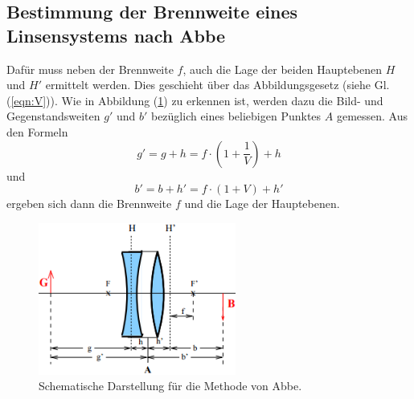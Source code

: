 \subsection{Bestimmung der Brennweite eines Linsensystems nach Abbe}
Dafür muss neben der Brennweite $f$, auch die Lage der beiden Hauptebenen $H$ und $H'$ ermittelt werden. Dies geschieht über das Abbildungsgesetz (siehe Gl. (\ref{eqn:V})). Wie in Abbildung (\ref{fig:Abbe}) zu erkennen ist, werden dazu die Bild- und Gegenstandsweiten $g'$ und $b'$ bezüglich eines beliebigen Punktes $A$ gemessen. Aus den Formeln
\begin{equation}
	g' = g + h = f \cdot \left( 1 + \frac{1}{V} \right) + h
\end{equation}
und
\begin{equation}
	b' = b + h' = f \cdot (1 + V) + h'
\end{equation}
ergeben sich dann die Brennweite $f$ und die Lage der Hauptebenen.

\begin{figure}[H]
	\centering
	\includegraphics[height=5cm]{picture/Abbe}
	\caption{Schematische Darstellung für die Methode von Abbe.}
	\label{fig:Abbe}
\end{figure}
